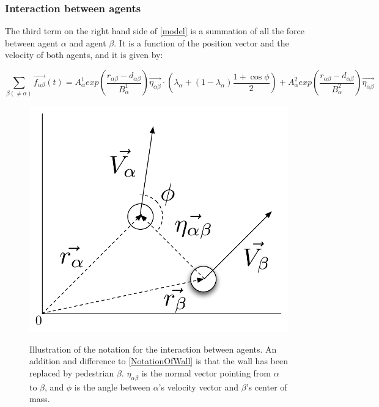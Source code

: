 \subsubsection{Interaction between agents}
The third term on the right hand side of \eqref{model} is a summation of all the 
force between agent $\alpha$ and agent $\beta$. It is a function of the position vector and the velocity of 
both agents, and it is given by:

\begin{equation}
    \sum_{\beta \left( \neq \alpha \right)}
        \vec{f_{\alpha \beta }}\left( t \right) =
        A_{\alpha}^{1} exp \left(
            \frac{ r_{\alpha \beta} - d_{\alpha \beta }}
                 {B_{\alpha}^1}
        \right)
    \vec{\eta_{\alpha \beta}} \cdot
    \left(
        \lambda_{\alpha} + \left(
            1 - \lambda_{\alpha}
        \right)
		\frac{1+\cos{\phi}}{2}
    \right) +
    A_{\alpha}^{2} exp\left(
        \frac{r_{\alpha \beta} - d_{\alpha \beta}}
             {B_{\alpha}^{2}}
    \right)
    \vec{\eta_{\alpha \beta}}
    \label{agentinteraction}
\end{equation}

\begin{figure}[ht]
    \centering
    {\includegraphics[scale=0.35]{Figures/NotationOfInteraction.pdf}} 
    \caption{Illustration of the notation for the interaction between agents.
	     An addition and difference to \ref{NotationOfWall} is that the wall has been replaced by pedestrian $\beta$.
	     $\eta_{\alpha \beta}$ is the normal vector pointing from $\alpha$ to $\beta$, and $\phi$ is the angle between $\alpha$'s 
	     velocity vector and $\beta$'s center of mass.}
    \label{NotationOfInteraction}
\end{figure}

